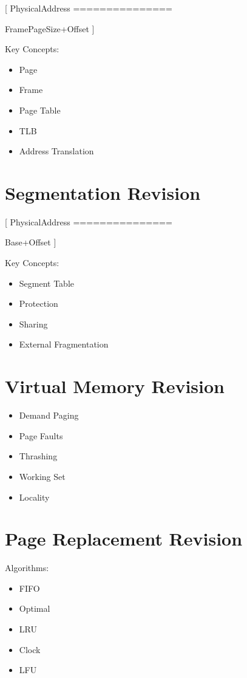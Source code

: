 [
PhysicalAddress
===============

Frame\times PageSize+Offset
]

Key Concepts:

\begin{itemize}
\item Page
\item Frame
\item Page Table
\item TLB
\item Address Translation
\end{itemize}

\section{Segmentation Revision}

[
PhysicalAddress
===============

Base+Offset
]

Key Concepts:

\begin{itemize}
\item Segment Table
\item Protection
\item Sharing
\item External Fragmentation
\end{itemize}

\section{Virtual Memory Revision}

\begin{itemize}
\item Demand Paging
\item Page Faults
\item Thrashing
\item Working Set
\item Locality
\end{itemize}

\section{Page Replacement Revision}

Algorithms:

\begin{itemize}
\item FIFO
\item Optimal
\item LRU
\item Clock
\item LFU
\end{itemize}


